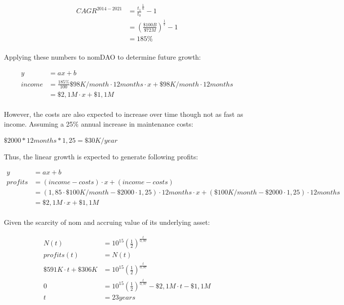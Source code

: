 \documentclass[12pt]{article}
\begin{document}
\begin{equation}\label{growth}
\begin{split}
CAGR^{2014-2021} &= \frac{t_{1}}{t_{0}}^{\frac{1}{n}}-1\\
 &=  (\frac{\$100B}{\$72M})^{\frac{1}{7}}-1\\
 &=185\%
\end{split}
\end{equation}
\\

Applying these numbers to nomDAO to determine future growth:

\begin{equation}\label{growth}
\begin{split}
y &=ax+b\\
income &=\frac{185\%}{100}\$98K/month \cdot 12months \cdot x + \$98K/month \cdot 12months\\
 &= \$2,1M \cdot x + \$1,1M
\end{split}
\end{equation}
\\

However, the costs are also expected to increase over time though not as fast as income. Assuming a 25\% annual increase in maintenance costs:

$\$2000*12months*1,25=\$30K/year$

Thus, the linear growth is expected to generate following profits:

\begin{equation}\label{profits}
\begin{split}
y &=ax+b\\
profits &=(income-costs) \cdot x + (income-costs)\\
 &= (1,85 \cdot \$100K/month - \$2000 \cdot 1,25)\cdot 12months \cdot  x + (\$100K/month - \$2000 \cdot 1,25)\cdot 12months\\
 &= \$2,1M \cdot x + \$1,1M
\end{split}
\end{equation}
\\

Given the scarcity of nom and accruing value of its underlying asset:

\begin{equation}\label{target}
\begin{split}
N(t) &=10^{15}(\frac{1}{2})^\frac{t}{0,97}\\
profits(t) &=N(t)\\
\$591K \cdot t+ \$306K&=10^{15}(\frac{1}{2})^\frac{t}{0,97}\\
0 &=10^{15}(\frac{1}{2})^\frac{t}{0,97}-\$2,1M \cdot t-\$1,1M\\
t &= 23years
\end{split}
\end{equation}
\\
\end{document}
